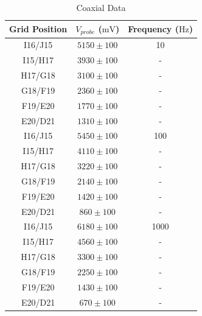 \documentclass[10pt, twocolumn]{article}
\theoremstyle{definition}
\begin{document}
\begin{table}[h]\centering
  \caption{Coaxial Data}
  \begin{tabular}{ccc}
    \toprule
    \textbf{Grid Position} & \textbf{$V_{probe}$ ($\unit{\milli\volt}$)} & \textbf{Frequency ($\unit{\hertz}$)} \\
    \midrule
    I16/J15                & $5150\pm100$                                & 10                                   \\
    I15/H17                & $3930\pm100$                                & -                                    \\
    H17/G18                & $3100\pm100$                                & -                                    \\
    G18/F19                & $2360\pm100$                                & -                                    \\
    F19/E20                & $1770\pm100$                                & -                                    \\
    E20/D21                & $1310\pm100$                                & -                                    \\
    \midrule
    I16/J15                & $5450\pm100$                                & 100                                  \\
    I15/H17                & $4110\pm100$                                & -                                    \\
    H17/G18                & $3220\pm100$                                & -                                    \\
    G18/F19                & $2140\pm100$                                & -                                    \\
    F19/E20                & $1420\pm100$                                & -                                    \\
    E20/D21                & $860\pm100$                                 & -                                    \\
    \midrule
    I16/J15                & $6180\pm100$                                & 1000                                 \\
    I15/H17                & $4560\pm100$                                & -                                    \\
    H17/G18                & $3300\pm100$                                & -                                    \\
    G18/F19                & $2250\pm100$                                & -                                    \\
    F19/E20                & $1430\pm100$                                & -                                    \\
    E20/D21                & $670\pm100$                                 & -
  \end{tabular}
  \label{table:coax-measurements}
\end{table}
\clearpage
\end{document}
